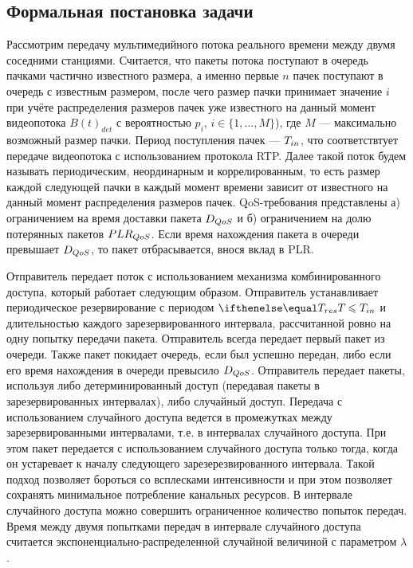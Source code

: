 \subsection{Формальная постановка задачи}
\label{sec:problem_statement}

Рассмотрим передачу мультимедийного потока реального времени между двумя соседними станциями.  Считается, что пакеты потока поступают в очередь пачками частично известного размера, а именно первые $n$ пачек поступают в очередь с известным размером, после чего размер пачки принимает значение $i$ при учёте распределения размеров пачек уже известного на данный момент видеопотока $B(t)_{det}$ с вероятностью $p_i$, $i \in \{1, \ldots, M\}$), где $M$ --- максимально возможный размер пачки. Период поступления пачек --- $T_{in}$, что соответствтует передаче видеопотока с использованием протокола RTP. Далее такой поток будем называть периодическим, неординарным и коррелированным, то есть размер каждой следующей пачки в каждый момент времени зависит от известного на данный момент распределения размеров пачек. QoS-требования представлены а) ограничением на время доставки пакета $D_{QoS}$ и б) ограничением на долю потерянных пакетов $PLR_{QoS}$. Если время нахождения пакета в очереди превышает $D_{QoS}$, то пакет отбрасывается, внося вклад в PLR.

Отправитель передает поток с использованием механизма комбинированного доступа, который работает следующим образом.
Отправитель устанавливает периодическое резервирование  с периодом $\Tres \leq \Tin$ и длительностью каждого зарезервированного интервала, рассчитанной ровно на одну попытку передачи пакета.
Отправитель всегда передает первый пакет из очереди.
Также пакет покидает очередь, если был успешно передан, либо если его время нахождения в очереди превысило $D_{QoS}$.
Отправитель передает пакеты, используя либо детерминированный доступ (передавая пакеты в зарезервированных интервалах), либо случайный доступ. 
Передача с использованием случайного доступа ведется в промежутках между зарезервированными интервалами, т.е. в интервалах случайного доступа.
При этом пакет передается с использованием случайного доступа только тогда, когда он устаревает к началу следующего зарезерезвированного интервала.
Такой подход позволяет бороться со всплесками интенсивности и при 
этом позволяет сохранять минимальное потребление канальных ресурсов.
В интервале случайного доступа можно совершить ограниченное количество попыток передач.
Время между двумя попытками передач в интервале случайного доступа считается  экспоненциально-распределенной случайной величиной с параметром $\lambda$. 

